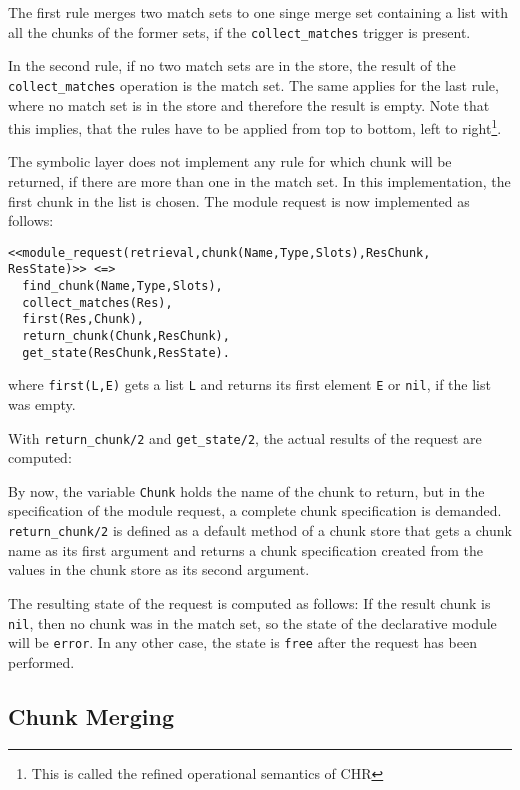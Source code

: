 The first rule merges two match sets to one singe merge set containing a list with all the chunks of the former sets, if the \lstinline|collect_matches| trigger is present. 

In the second rule, if no two match sets are in the store, the result of the \lstinline|collect_matches| operation is the match set. The same applies for the last rule, where no match set is in the store and therefore the result is empty. Note that this implies, that the rules have to be applied from top to bottom, left to right\footnote{This is called the refined operational semantics of CHR}.

The symbolic layer does not implement any rule for which chunk will be returned, if there are more than one in the match set. In this implementation, the first chunk in the list is chosen. The module request is now implemented as follows:

\begin{lstlisting}
<<module_request(retrieval,chunk(Name,Type,Slots),ResChunk, ResState)>> <=> 
  find_chunk(Name,Type,Slots),
  collect_matches(Res),
  first(Res,Chunk),
  return_chunk(Chunk,ResChunk),
  get_state(ResChunk,ResState).
\end{lstlisting}

where \lstinline|first(L,E)| gets a list \lstinline|L| and returns its first element \lstinline|E| or \lstinline|nil|, if the list was empty.

With \lstinline|return_chunk/2| and \lstinline|get_state/2|, the actual results of the request are computed:

By now, the variable \lstinline|Chunk| holds the name of the chunk to return, but in the specification of the module request, a complete chunk specification is demanded. \lstinline|return_chunk/2| is defined as a default method of a chunk store that gets a chunk name as its first argument and returns a chunk specification created from the values in the chunk store as its second argument.

The resulting state of the request is computed as follows: If the result chunk is \lstinline|nil|, then no chunk was in the match set, so the state of the declarative module will be \lstinline|error|. In any other case, the state is \lstinline|free| after the request has been performed.

\subsection{Chunk Merging}

